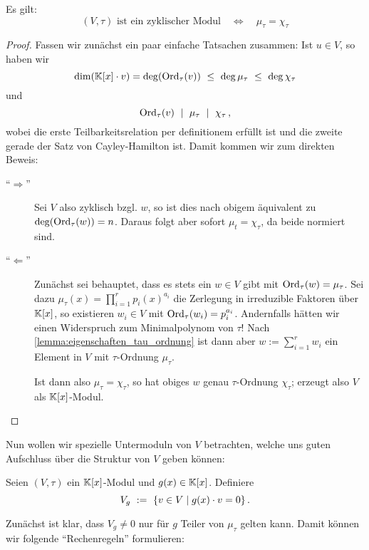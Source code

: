 \begin{satz}
  Es gilt:
  \[ (V,\tau) \text{ ist ein zyklischer Modul} \quad\Leftrightarrow\quad
    \mu_\tau = \chi_\tau\]
\end{satz}
\begin{proof}
  Fassen wir zunächst ein paar einfache Tatsachen zusammen:
  Ist $u \in V$, so haben wir 
  \[ \dim(\mathbb{K}[x]\cdot v) = \deg( \operatorname{Ord}_\tau(v) ) \ \leq\  
    \deg\mu_\tau \ \leq\  \deg \chi_\tau \]
  und 
  \[ \operatorname{Ord}_\tau (v) \ \mid\  \mu_\tau \ \mid\  \chi_\tau \,,\]
  wobei die erste Teilbarkeitsrelation per definitionem erfüllt ist und die
  zweite gerade der Satz von Cayley-Hamilton ist.
  Damit kommen wir zum direkten Beweis:
  \begin{description}
    \item["`$\Rightarrow$"'] Sei $V$ also zyklisch bzgl. $w$, so ist dies nach
      obigem äquivalent zu $\deg(\operatorname{Ord}_\tau(w)) = n$. Daraus folgt aber sofort
      $\mu_t = \chi_\tau$, da beide normiert sind.
    \item["`$\Leftarrow$"'] Zunächst sei behauptet, dass es stets ein 
      $w \in V$ gibt mit $\operatorname{Ord}_\tau(w) = \mu_\tau$. Sei dazu 
      $\mu_\tau(x) = \prod_{i=1}^r p_i(x)^{a_i}$ die Zerlegung in irreduzible
      Faktoren über $\mathbb{K}[x]$, so existieren $w_i \in V$ mit
      $\operatorname{Ord}_\tau(w_i) = p_i^{a_i}$. Andernfalls hätten wir einen Widerspruch 
      zum Minimalpolynom von $\tau$!
      Nach \autoref{lemma:eigenschaften_tau_ordnung} ist dann aber 
      $w := \sum_{i=1}^r w_i$ ein Element in $V$ mit $\tau$-Ordnung $\mu_\tau$.

      Ist dann also $\mu_\tau = \chi_\tau$, so hat obiges $w$ genau
      $\tau$-Ordnung $\chi_\tau$; erzeugt also $V$ als $\mathbb{K}[x]$-Modul.
  \end{description}
\end{proof}

Nun wollen wir spezielle Untermoduln von $V$ betrachten, welche uns guten
Aufschluss über die Struktur von $V$ geben können:

\begin{notation}
  Seien $(V,\tau)$ ein $\mathbb{K}[x]$-Modul und $g(x) \in \mathbb{K}[x]$.
  Definiere
  \[ V_g \ :=\  \{ v \in V \mid g(x)\cdot v = 0 \}\,.\]
\end{notation}

Zunächst ist klar, dass $V_g \neq 0$ nur für $g$ Teiler von $\mu_\tau$ gelten
kann. Damit können wir folgende "`Rechenregeln"' formulieren:

